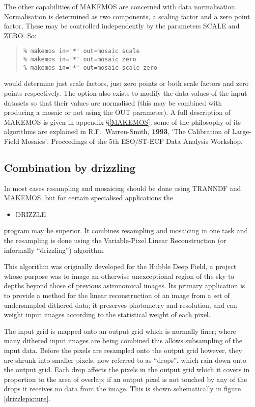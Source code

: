 \documentclass[twoside,11pt]{article}
\newcommand{\hyperref}[4]{#2\ref{#4}#3}
\newcommand{\htmlref}[2]{#1}
\newcommand{\latexhtml}[2]{#1}
\newcommand{\xlabel}[1]{}
\renewcommand{\_}{\texttt{\symbol{95}}}
\newcommand{\ttsize}{\latexhtml{\small}{}}
\newenvironment{myquote}{\begin{quote}\ttsize}{\end{quote}}
\newcommand{\routine}[1]{{\sc #1}}
\newcommand{\xroutine}[1]{\htmlref{{\sc #1}}{#1}}
\begin{document}
The other capabilities of \routine{MAKEMOS} are concerned 
with data normalisation.
Normalisation is determined as two components, a scaling factor and a
zero point factor. These may be controlled independently by the
parameters SCALE and ZERO. So:
\begin{myquote}
\begin{verbatim}
% makemos in='*' out=mosaic scale
% makemos in='*' out=mosaic zero
% makemos in='*' out=mosaic scale zero
\end{verbatim}
\end{myquote}
would determine just scale factors, just zero points or both scale
factors and zero points respectively. The option also exists to modify
the data values of the input datasets so that their values are
normalised (this may be combined with producing a mosaic or not using
the OUT parameter). A full description of \routine{MAKEMOS}
is given in appendix \S\ref{MAKEMOS}, some of the philosophy of
its algorithms are explained in R.F.~Warren-Smith, {\bf 1993},
`The Calibration of Large-Field Mosaics', Proceedings of the 5th
ESO/ST-ECF Data Analysis Workshop.


\subsection{\label{drizzling}\xlabel{drizzling}Combination by drizzling}

In most cases resampling and mosaicing should be done using
\routine{TRANNDF} and \routine{MAKEMOS}, but for certain specialised
applications the
\begin{itemize}
\item \xroutine{DRIZZLE}
\end{itemize}
program may be superior. 
It combines resampling and mosaicing in one task
and the resampling is done using the Variable-Pixel Linear Reconstruction
(or informally ``drizzling'') algorithm.

This algorithm was originally developed for the Hubble Deep
Field, a project whose purpose was to image an otherwise unexceptional
region of the sky to depths beyond those of previous astronomical images.
Its primary application is to provide a method for the linear
reconstruction of an image from a set of undersampled dithered data;
it preserves photometry and resolution, and can weight input images
according to the statistical weight of each pixel.

The input grid is mapped onto an output grid which is normally
finer; where many dithered input images are being combined this
allows subsampling of the input data.
Before the pixels are resampled onto the output grid however,
they are shrunk into smaller pixels, now referred to as ``drops'',
which rain down onto the output grid.
Each drop affects the pixels in the output grid which it covers
in proportion to the area of overlap; if an output pixel is
not touched by any of the drops it receives no data from the image.
This is shown schematically 
in \hyperref{the figure}{figure }{}{drizzlepicture}.
\end{document}
